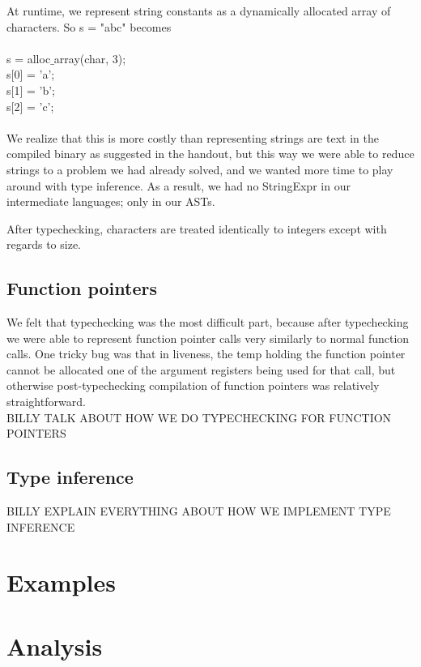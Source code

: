 \documentclass{article}
\begin{document}
At runtime, we represent string constants as a dynamically allocated array of characters. So s = "abc" becomes\\
\\
s = alloc$\_$array(char, 3);\\
s[0] = 'a';\\
s[1] = 'b';\\
s[2] = 'c';\\
\\
We realize that this is more costly than representing strings are text in the compiled binary as suggested in the handout, but this way we were able to reduce strings to a problem we had already solved, and we wanted more time to play around with type inference. As a result, we had no StringExpr in our intermediate languages; only in our ASTs.

After typechecking, characters are treated identically to integers except with regards to size.

\subsection{Function pointers}
We felt that typechecking was the most difficult part, because after typechecking we were able to represent function pointer calls very similarly to normal function calls. One tricky bug was that in liveness, the temp holding the function pointer cannot be allocated one of the argument registers being used for that call, but otherwise post-typechecking compilation of function pointers was relatively straightforward.\\ 

BILLY TALK ABOUT HOW WE DO TYPECHECKING FOR FUNCTION POINTERS

\subsection{Type inference}
BILLY EXPLAIN EVERYTHING ABOUT HOW WE IMPLEMENT TYPE INFERENCE

\section{Examples}

\section{Analysis}
\end{document}
